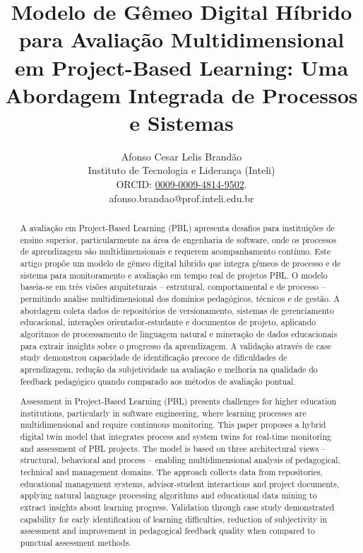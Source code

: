 \documentclass[english, spanish, brazilian]{modelo_dt}
\title{Modelo de Gêmeo Digital Híbrido para Avaliação Multidimensional em Project-Based Learning: Uma Abordagem Integrada de Processos e Sistemas}
\author{%
	\parbox{8cm}{%
		Afonso Cesar Lelis Brandão\\
		Instituto de Tecnologia e Liderança (Inteli)\\
		ORCID: \href{https://orcid.org/0009-0009-4814-9502}{0009-0009-4814-9502}\@.\\
		afonso.brandao@prof.inteli.edu.br
	}
}
\begin{document}
\maketitle

\begin{otherlanguage}{brazilian}
\begin{abstract}
A avaliação em Project-Based Learning (PBL) apresenta desafios para instituições de ensino superior, particularmente na área de engenharia de software, onde os processos de aprendizagem são multidimensionais e requerem acompanhamento contínuo\@. Este artigo propõe um modelo de gêmeo digital híbrido que integra gêmeos de processo e de sistema para monitoramento e avaliação em tempo real de projetos PBL\@. O modelo baseia-se em três visões arquiteturais -- estrutural, comportamental e de processo -- permitindo análise multidimensional dos domínios pedagógicos, técnicos e de gestão\@. A abordagem coleta dados de repositórios de versionamento, sistemas de gerenciamento educacional, interações orientador-estudante e documentos de projeto, aplicando algoritmos de processamento de linguagem natural e mineração de dados educacionais para extrair insights sobre o progresso da aprendizagem\@. A validação através de case study demonstrou capacidade de identificação precoce de dificuldades de aprendizagem, redução da subjetividade na avaliação e melhoria na qualidade do feedback pedagógico quando comparado aos métodos de avaliação pontual\@.
\end{abstract}
\end{otherlanguage}

\begin{otherlanguage}{english}
\begin{abstract}
Assessment in Project-Based Learning (PBL) presents challenges for higher education institutions, particularly in software engineering, where learning processes are multidimensional and require continuous monitoring\@. This paper proposes a hybrid digital twin model that integrates process and system twins for real-time monitoring and assessment of PBL projects\@. The model is based on three architectural views -- structural, behavioral and process -- enabling multidimensional analysis of pedagogical, technical and management domains\@. The approach collects data from repositories, educational management systems, advisor-student interactions and project documents, applying natural language processing algorithms and educational data mining to extract insights about learning progress\@. Validation through case study demonstrated capability for early identification of learning difficulties, reduction of subjectivity in assessment and improvement in pedagogical feedback quality when compared to punctual assessment methods\@.
\end{abstract}
\end{otherlanguage}
\end{document}
